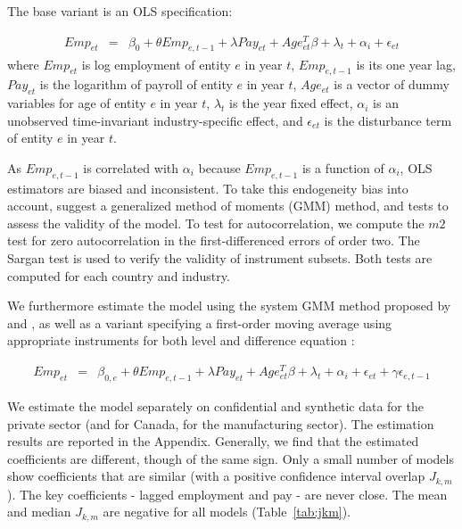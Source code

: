 The base variant is an OLS specification:

\begin{eqnarray}	
\label{eq:OLS}
Emp_{et} & = & \beta_0 + \theta Emp_{e,t-1} + \lambda Pay_{et} + Age_{et}^{T}\beta + \lambda_t + \alpha_i + \epsilon_{et}
\end{eqnarray}
where $Emp_{et}$ is log employment of entity $e$ in year $t$, $Emp_{e,t-1}$ is its one year lag, $Pay_{et}$ is the logarithm of payroll of entity $e$ in year $t$, $Age_{et}$ is a vector of dummy variables for age of entity $e$ in year $t$, $\lambda_t$ is the year fixed effect, $\alpha_i$ is an unobserved time-invariant industry-specific effect, and $\epsilon_{et}$ is the disturbance term of entity $e$ in year $t$. 


As $Emp_{e,t-1}$ is correlated with $\alpha_{i}$ because $Emp_{e,t-1}$ is a function of $\alpha_{i}$, 
OLS estimators are biased and inconsistent. 
To take this endogeneity bias into account,  \textcite{RePEc:oup:restud:v:58:y:1991:i:2:p:277-297.} suggest a generalized method of moments (GMM) method, and tests to assess the  validity of the model.  To test for autocorrelation, we compute the  $m2$ test  for zero autocorrelation in the  first-differenced errors of order two. The Sargan test is used to verify the validity of instrument subsets. Both tests are computed for each country and industry.

We furthermore estimate the model using the system GMM  method proposed by \textcite{RePEc:eee:econom:v:68:y:1995:i:1:p:29-51} and \textcite{RePEc:eee:econom:v:87:y:1998:i:1:p:115-143}, as well as a variant specifying a first-order moving average using appropriate instruments for both level and difference equation  \parencite{RePEc:eee:econom:v:68:y:1995:i:1:p:29-51,RePEc:eee:econom:v:87:y:1998:i:1:p:115-143}:

\begin{eqnarray}	
Emp_{et}&=&\beta_{0,e} +\theta Emp_{e,t-1}+\lambda Pay_{et}+Age_{et}^{T}\beta+\lambda_t+\alpha_i+\epsilon_{et}+\gamma\epsilon_{e,t-1}
\end{eqnarray}


We estimate the model separately on confidential and synthetic data for the private sector (and for Canada, for the manufacturing sector). The estimation results are reported in the Appendix. Generally, we find that the estimated coefficients are different, though of the same sign. Only a small number of models show coefficients that are similar (with a positive confidence interval overlap $J_{k,m}$). The key coefficients - lagged employment and pay - are never close. The mean and median $J_{k,m}$ are negative for all models (Table~\ref{tab:jkm}).




